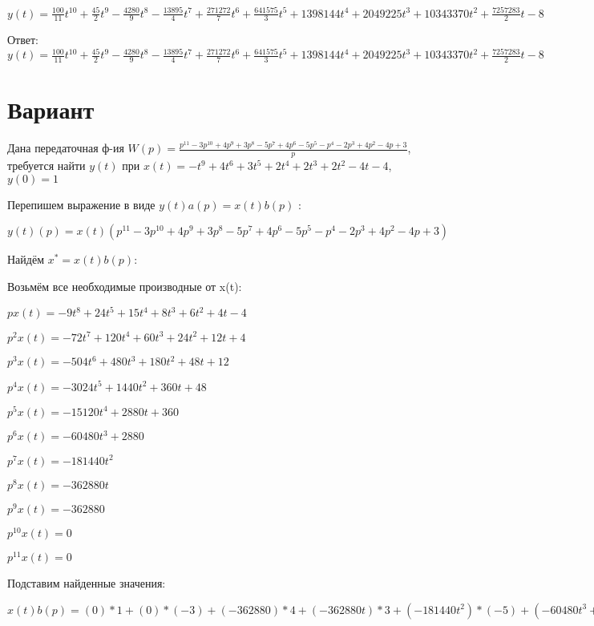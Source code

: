 \documentclass{article}
\begin{document}
{{{$y(t)=\frac{100}{11}t^{10}+\frac{45}{2}t^{9}-\frac{4280}{9}t^{8}-\frac{13895}{4}t^{7}+\frac{271272}{7}t^{6}+\frac{641575}{3}t^{5}+1398144t^{4}+2049225t^{3}+10343370t^{2}+\frac{7257283}{2}t-8$

Ответ: $y(t) = \frac{100}{11}t^{10}+\frac{45}{2}t^{9}-\frac{4280}{9}t^{8}-\frac{13895}{4}t^{7}+\frac{271272}{7}t^{6}+\frac{641575}{3}t^{5}+1398144t^{4}+2049225t^{3}+10343370t^{2}+\frac{7257283}{2}t-8$

\section{Вариант}

Дана передаточная ф-ия $W(p)=\frac{p^{11}-3p^{10}+4p^{9}+3p^{8}-5p^{7}+4p^{6}-5p^{5}-p^{4}-2p^{3}+4p^{2}-4p+3}{p}$, требуется найти $y(t)$ при $x(t)=-t^{9}+4t^{6}+3t^{5}+2t^{4}+2t^{3}+2t^{2}-4t-4$, $y(0)=1$

Перепишем выражение в виде $y(t)a(p)=x(t)b(p)$ :

$y(t)(p)=x(t)(p^{11}-3p^{10}+4p^{9}+3p^{8}-5p^{7}+4p^{6}-5p^{5}-p^{4}-2p^{3}+4p^{2}-4p+3)$

Найдём $x^*=x(t)b(p)$:

Возьмём все необходимые производные от x(t):

$px(t)=-9t^{8}+24t^{5}+15t^{4}+8t^{3}+6t^{2}+4t-4$

$p^2x(t)=-72t^{7}+120t^{4}+60t^{3}+24t^{2}+12t+4$

$p^3x(t)=-504t^{6}+480t^{3}+180t^{2}+48t+12$

$p^4x(t)=-3024t^{5}+1440t^{2}+360t+48$

$p^5x(t)=-15120t^{4}+2880t+360$

$p^6x(t)=-60480t^{3}+2880$

$p^7x(t)=-181440t^{2}$

$p^8x(t)=-362880t$

$p^9x(t)=-362880$

$p^10x(t)=0$

$p^11x(t)=0$

Подставим найденные значения:

$x(t)b(p) = (0)*1+(0)*(-3)+(-362880)*4+(-362880t)*3+(-181440t^{2})*(-5)+(-60480t^{3}+2880)*4+(-15120t^{4}+2880t+360)*(-5)+(-3024t^{5}+1440t^{2}+360t+48)*(-1)+(-504t^{6}+480t^{3}+180t^{2}+48t+12)*(-2)+(-72t^{7}+120t^{4}+60t^{3}+24t^{2}+12t+4)*4+(-9t^{8}+24t^{5}+15t^{4}+8t^{3}+6t^{2}+4t-4)*(-4)+(-9t^{8}+24t^{5}+15t^{4}+8t^{3}+6t^{2}+4t-4)*3=9t^{8}-288t^{7}+1008t^{6}+3000t^{5}+76065t^{4}-242648t^{3}+905490t^{2}-1103452t$





}}}
\end{document}

